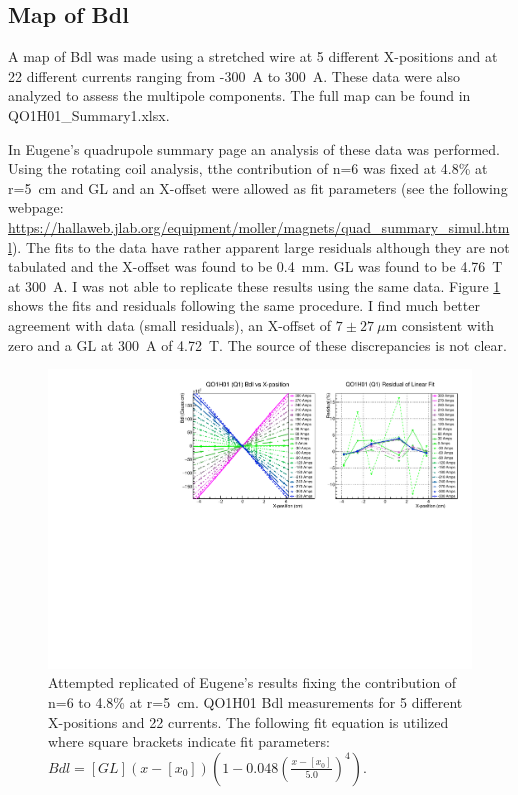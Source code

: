 \documentclass[12pt]{article}
\begin{document}
\subsection{Map of Bdl}
A map of Bdl was made using a stretched wire at 5 different X-positions and at 22 different currents ranging from -300~A to 300~A. These data were also analyzed to assess the multipole components. The full map can be found in QO1H01\_Summary1.xlsx. 

In Eugene's quadrupole summary page an analysis of these data was performed. Using the rotating coil analysis, tthe contribution of n=6 was fixed at 4.8\% at r=5~cm and GL and an X-offset were allowed as fit parameters (see the following webpage: \href{https://hallaweb.jlab.org/equipment/moller/magnets/quad_summary_simul.html}{https://hallaweb.jlab.org/equipment/moller/magnets/quad\_summary\_simul.html}). The fits to the data have rather apparent large residuals although they are not tabulated and the X-offset was found to be 0.4~mm. GL was found to be 4.76~T at 300~A. I was not able to replicate these results using the same data. Figure \ref{fig:EugeneComp} shows the fits and residuals following the same procedure. I find much better agreement with data (small residuals), an X-offset of $7\pm27~\mu$m consistent with zero and a GL at 300~A of 4.72~T. The source of these discrepancies is not clear.
\begin{figure}[!h]
\centering
\includegraphics[width=1\textwidth]{EugeneCompNewQ1.pdf}
\caption{\label{fig:EugeneComp}Attempted replicated of Eugene's results fixing the contribution of n=6 to 4.8\% at r=5~cm. QO1H01 Bdl measurements for 5 different X-positions and 22 currents. The following fit equation is utilized where square brackets indicate fit parameters: $Bdl=[GL](x-[x_0])\left(1-0.048\left(\frac{x-[x_0]}{5.0}\right)^4\right)$.}
\end{figure}
\end{document}
